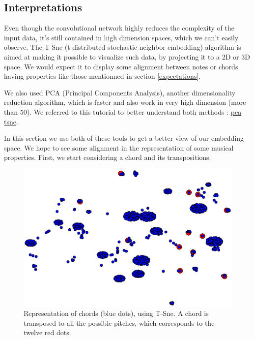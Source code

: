 \documentclass{article}
\begin{document}
\subsection{Interpretations}

Even though the convolutional network highly reduces the complexity of the input data, it's still contained in high dimension spaces, which we can't easily observe. The T-Sne (t-distributed stochastic neighbor embedding) algorithm is aimed at making it possible to visualize such data, by projecting it to a 2D or 3D space. We would expect it to display some alignment between notes or chords having properties like those mentionned in section \ref{expectations}.

We also used PCA (Principal Components Analysis), another dimensionality reduction algorithm, which is faster and also work in very high dimension (more than 50). We referred to this tutorial to better understand both methods : \href{https://medium.com/@luckylwk/visualising-high-dimensional-datasets-using-pca-and-t-sne-in-python-8ef87e7915b}{pca tsne}. 

In this section we use both of these tools to get a better view of our embedding space. We hope to see some alignment in the representation of some musical properties. First, we start considering a chord and its transpositions.

\begin{figure}[H]
\centering
\includegraphics[width =1\textwidth]{tsne_1chord_transpositions.eps}
\caption{Representation of chords (blue dots), using T-Sne. A chord is transposed to all the possible pitches, which corresponds to the twelve red dots.}
\label{results1}
\end{figure}
\end{document}

